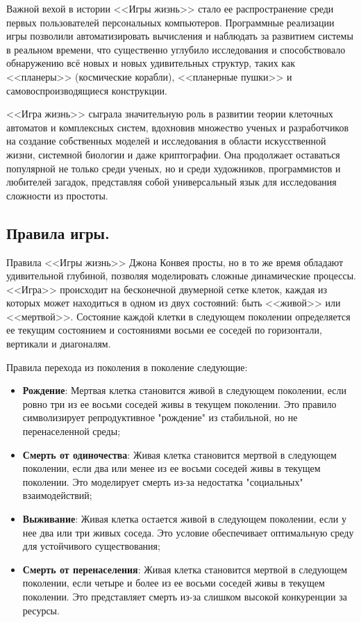 Важной вехой в истории <<Игры жизнь>> стало ее распространение среди первых пользователей персональных компьютеров. Программные реализации игры позволили автоматизировать вычисления и наблюдать за развитием системы в реальном времени, что существенно углубило исследования и способствовало обнаружению всё новых и новых удивительных структур, таких как <<планеры>> (космические корабли), <<планерные пушки>> и самовоспроизводящиеся конструкции.

<<Игра жизнь>> сыграла значительную роль в развитии теории клеточных автоматов и комплексных систем, вдохновив множество ученых и разработчиков на создание собственных моделей и исследования в области искусственной жизни, системной биологии и даже криптографии. Она продолжает оставаться популярной не только среди ученых, но и среди художников, программистов и любителей загадок, представляя собой универсальный язык для исследования сложности из простоты.

\subsection{\label{subsec:ch01/sec04/subsec02}Правила игры.}
Правила <<Игры жизнь>> Джона Конвея просты, но в то же время обладают удивительной глубиной, позволяя моделировать сложные динамические процессы. <<Игра>> происходит на бесконечной двумерной сетке клеток, каждая из которых может находиться в одном из двух состояний: быть <<живой>> или <<мертвой>>. Состояние каждой клетки в следующем поколении определяется ее текущим состоянием и состояниями восьми ее соседей по горизонтали, вертикали и диагоналям.

Правила перехода из поколения в поколение следующие:
	\begin{itemize}
		\item \textbf{Рождение}: Мертвая клетка становится живой в следующем поколении, если ровно три из ее восьми соседей живы в текущем поколении. Это правило символизирует репродуктивное "рождение" из стабильной, но не перенаселенной среды;
		\item \textbf{Смерть от одиночества}: Живая клетка становится мертвой в следующем поколении, если два или менее из ее восьми соседей живы в текущем поколении. Это моделирует смерть из-за недостатка "социальных" взаимодействий;
		\item \textbf{Выживание}: Живая клетка остается живой в следующем поколении, если у нее два или три живых соседа. Это условие обеспечивает оптимальную среду для устойчивого существования;
		\item \textbf{Смерть от перенаселения}: Живая клетка становится мертвой в следующем поколении, если четыре и более из ее восьми соседей живы в текущем поколении. Это представляет смерть из-за слишком высокой конкуренции за ресурсы.
	\end{itemize}

